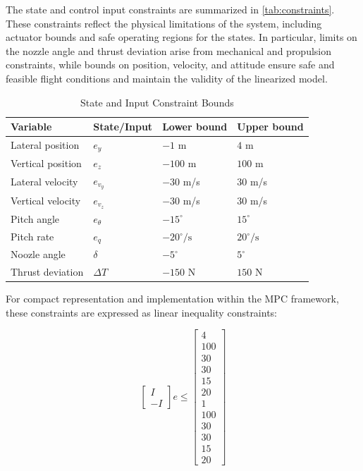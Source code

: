 \documentclass[10pt,twocolumn,twoside]{IEEEtran}
\begin{document}
The state and control input constraints are summarized in \autoref{tab:constraints}. These constraints reflect the physical limitations of the system, including actuator bounds and safe operating regions for the states. In particular, limits on the nozzle angle and thrust deviation arise from mechanical and propulsion constraints, while bounds on position, velocity, and attitude ensure safe and feasible flight conditions and maintain the validity of the linearized model.
\begin{table}[H]
    \centering
    \caption{State and Input Constraint Bounds}
    \label{tab:constraints}
    \begin{tabular}{llll}
    \toprule
    Variable & State/Input & Lower bound & Upper bound \\
    \midrule
    Lateral position   & $e_y$     & $-1$ m        & $4$ m \\
    Vertical position  & $e_z$     & $-100$ m      & $100$ m \\
    Lateral velocity   & $e_{v_y}$ & $-30$ m/s     & $30$ m/s \\
    Vertical velocity  & $e_{v_z}$ & $-30$ m/s     & $30$ m/s \\
    Pitch angle        & $e_\theta$& $-15^{\circ}$ & $15^{\circ}$ \\
    Pitch rate         & $e_q$     & $-20^{\circ}/\mathrm{s}$ & $20^{\circ}/\mathrm{s}$ \\
    \midrule
    Noozle angle       & $\delta$  & $-5^{\circ}$  & $5^{\circ}$ \\
    Thrust deviation   & $\Delta T$& $-150$ N      & $150$ N \\
    \bottomrule
    \end{tabular}
\end{table}
For compact representation and implementation within the MPC framework, these constraints are expressed as linear inequality constraints:

\begin{equation}
    \begin{bmatrix}
    I \\
    -I
    \end{bmatrix}
    e
    \le
    \begin{bmatrix}
    4 \\ 100 \\ 30 \\ 30 \\ 15 \\ 20 \\
    1 \\ 100 \\ 30 \\ 30 \\ 15 \\ 20
    \end{bmatrix}
    \label{eq:2.10}
\end{equation}\\
\end{document}
